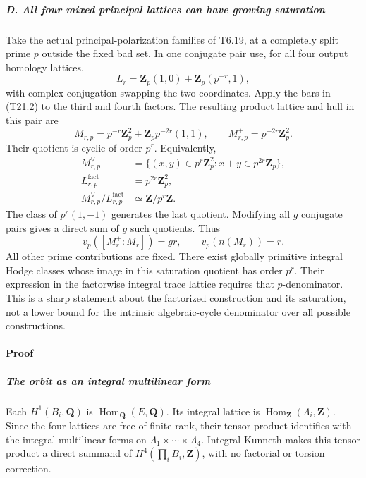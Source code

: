 \documentclass[11pt,a4paper]{article}
\theoremstyle{definition}
\begin{document}
\subparagraph{D. All four mixed principal lattices can have growing saturation}\label{d.-all-four-mixed-principal-lattices-can-have-growing-saturation}

Take the actual principal-polarization families of T6.19, at a completely split prime \(p\) outside the fixed bad set. In one conjugate pair use, for all four output homology lattices, \[
 L_r=\mathbf Z_p(1,0)+\mathbf Z_p(p^{-r},1),
\] with complex conjugation swapping the two coordinates. Apply the bars in (T21.2) to the third and fourth factors. The resulting product lattice and hull in this pair are \[
 M_{r,p}
   =p^{-r}\mathbf Z_p^2+
           \mathbf Z_p p^{-2r}(1,1),
 \qquad
 M_{r,p}^+=p^{-2r}\mathbf Z_p^2.
 \tag{T21.10}
\] Their quotient is cyclic of order \(p^r\). Equivalently, \[
 \begin{aligned}
 M_{r,p}^\vee
  &=\{(x,y)\in p^r\mathbf Z_p^2:x+y\in p^{2r}\mathbf Z_p\},\\
 L_{r,p}^{\mathrm{fact}}&=p^{2r}\mathbf Z_p^2,\\
 M_{r,p}^\vee/L_{r,p}^{\mathrm{fact}}&\simeq\mathbf Z/p^r\mathbf Z.
 \end{aligned}
 \tag{T21.11}
\] The class of \(p^r(1,-1)\) generates the last quotient. Modifying all \(g\) conjugate pairs gives a direct sum of \(g\) such quotients. Thus \[
 v_p([M_r^+:M_r])=gr,
 \qquad v_p(n(M_r))=r.
 \tag{T21.12}
\] All other prime contributions are fixed. There exist globally primitive integral Hodge classes whose image in this saturation quotient has order \(p^r\). Their expression in the factorwise integral trace lattice requires that \(p\)-denominator. This is a sharp statement about the factorized construction and its saturation, not a lower bound for the intrinsic algebraic-cycle denominator over all possible constructions.

\paragraph{Proof}\label{proof-2}

\subparagraph{The orbit as an integral multilinear form}\label{the-orbit-as-an-integral-multilinear-form}

Each \(H^1(B_i,\mathbf Q)\) is \(\operatorname{Hom}_{\mathbf Q}(E,\mathbf Q)\). Its integral lattice is \(\operatorname{Hom}_{\mathbf Z}(\Lambda_i,\mathbf Z)\). Since the four lattices are free of finite rank, their tensor product identifies with the integral multilinear forms on \(\Lambda_1\times\cdots\times\Lambda_4\). Integral Kunneth makes this tensor product a direct summand of \(H^4(\prod_i B_i,\mathbf Z)\), with no factorial or torsion correction.
\end{document}
